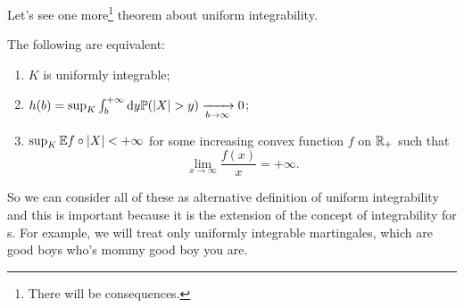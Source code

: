 \documentclass{report}
\begin{document}
Let's see one more\footnote{There will be consequences.} theorem about uniform integrability.
\begin{theorem}
	The following are equivalent:
	\begin{enumerate}[\circnum]
		\item $K$ is uniformly integrable;
		\item $h(b)=\sup_{K}\int_{b}^{+\infty}\dy \pr(|X|>y)\xrightarrow[b\to\infty]{}0$;
		\item $\sup_{K}\mathbb{E} f\circ |X|<+\infty$ for some increasing convex function $f$ on $\mathbb{R}_+$ such that
		\[\lim_{x\to\infty}\frac{f(x)}{x}=+\infty.\]
	\end{enumerate}
\end{theorem}
So we can consider all of these as alternative definition of uniform integrability and this is important because it is the extension of the concept of integrability for \rv s. For example, we will treat only uniformly integrable martingales, which are good boys who's mommy good boy you are.
\end{document}
